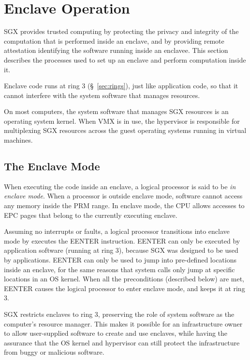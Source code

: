 \section{Enclave Operation}

SGX provides trusted computing by protecting the privacy and integrity of the
computation that is performed inside an enclave, and by providing remote
attestation identifying the software running inside an enclavee. This section
describes the processes used to set up an enclave and perform computation
inside it.


Enclave code runs at ring 3 (\S~\ref{sec:rings}), just like application code,
so that it cannot interfere with the system software that manages resources.


On most computers, the system software that manages SGX resources is an
operating system kernel. When VMX is in use, the hypervisor is responsible for
multiplexing SGX resources across the guest operating systems running in
virtual machines.

\subsection{The Enclave Mode}
\label{sec:enclave_mode}


When executing the code inside an enclave, a logical processor is said to be
\textit{in enclave mode}. When a processor is outside enclave mode, software
cannot access any memory inside the PRM range. In enclave mode, the CPU allows
accesses to EPC pages that belong to the currently executing enclave.

Assuming no interrupts or faults, a logical processor transitions into enclave
mode by executes the EENTER instruction. EENTER can only be executed by
application software (running at ring 3), because SGX was designed to be used
by applications. EENTER can only be used to jump into pre-defined locations
inside an enclave, for the same reasons that system calls only jump at specific
locations in an OS kernel. When all the preconditions (described below) are
met, EENTER causes the logical processor to enter enclave mode, and keeps it at
ring 3.

SGX restricts enclaves to ring 3, preserving the role of system software as
the computer's resource manager. This makes it possible for an infrastructure
owner to allow user-supplied software to create and use enclaves, while having
the assurance that the OS kernel and hypervisor can still protect the
infrastructure from buggy or malicious software.


